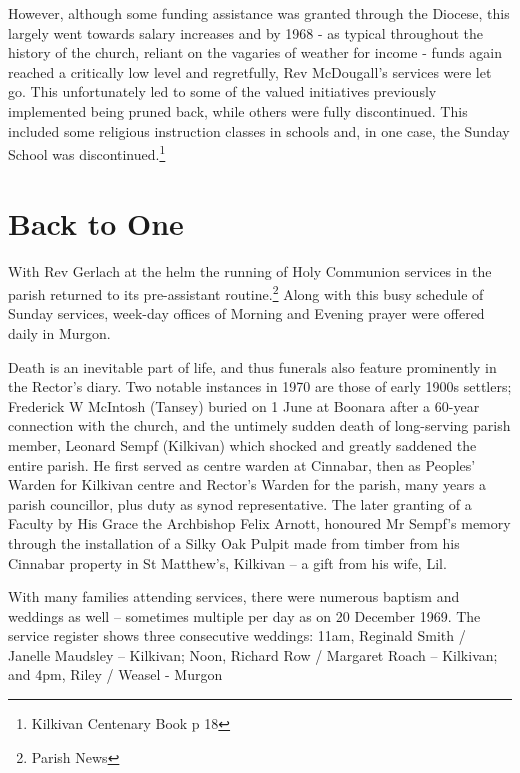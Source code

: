 However, although some funding assistance was granted through the Diocese, this largely went towards salary increases and by 1968 - as typical throughout the history of the church, reliant on the vagaries of weather for income - funds again reached a critically low level and regretfully, Rev McDougall's services were let go. This unfortunately led to some of the valued initiatives previously implemented being pruned back, while others were fully discontinued. This included some religious instruction classes in schools and, in one case, the Sunday School was discontinued.\footnote{Kilkivan Centenary Book p 18}


\section{Back to One}



With Rev Gerlach at the helm the running of Holy Communion services in the parish returned to its pre-assistant routine.\footnote{Parish News} Along with this busy schedule of Sunday services, week-day offices of Morning and Evening prayer were offered daily in Murgon.


Death is an inevitable part of life, and thus funerals also feature prominently in the Rector's diary. Two notable instances in 1970 are those of early 1900s settlers; Frederick W McIntosh (Tansey) buried on 1 June at Boonara after a 60-year connection with the church, and the untimely sudden death of long-serving parish member, Leonard Sempf (Kilkivan) which shocked and greatly saddened the entire parish. He first served as centre warden at Cinnabar, then as Peoples' Warden for Kilkivan centre and Rector's Warden for the parish, many years a parish councillor, plus duty as synod representative. The later granting of a Faculty by His Grace the Archbishop Felix Arnott, honoured Mr Sempf's memory through the installation of a Silky Oak Pulpit made from timber from his Cinnabar property in St Matthew's, Kilkivan -- a gift from his wife, Lil.



With many families attending services, there were numerous baptism and weddings as well -- sometimes multiple per day as on 20 December 1969. The service register shows three consecutive weddings: 11am, Reginald Smith / Janelle Maudsley -- Kilkivan; Noon, Richard Row / Margaret Roach -- Kilkivan; and 4pm, Riley / Weasel - Murgon



